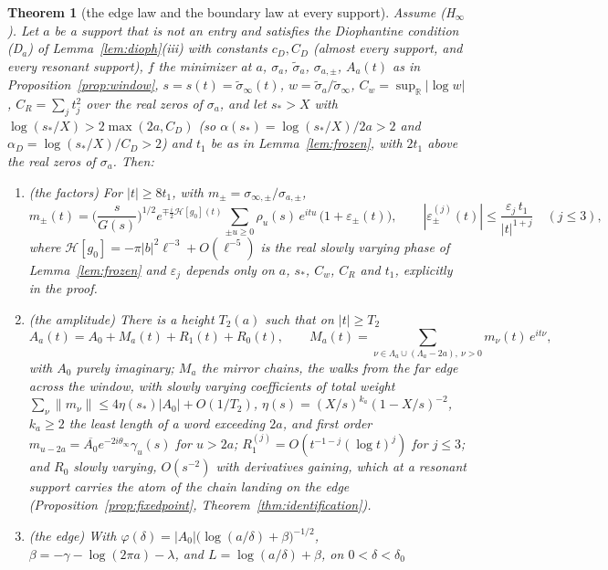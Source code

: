 \documentclass[11pt]{article}
\newtheorem{theorem}{Theorem}[section]
\theoremstyle{definition}
\theoremstyle{remark}
\newcommand{\R}{\mathbb{R}}
\begin{document}
\begin{theorem}[the edge law and the boundary law at every support]\label{thm:everysupport}
Assume (H$_\infty$). Let $a$ be a support that is not an entry and satisfies the Diophantine condition (D$_a$) of Lemma~\ref{lem:dioph}(iii) with constants $c_D,C_D$ (almost every support, and every resonant support), $f$ the minimizer at $a$, $\sigma_a$, $\tilde\sigma_a$, $\sigma_{a,\pm}$, $A_a(t)$ as in Proposition~\ref{prop:window}, $s=s(t)=\tilde\sigma_\infty(t)$, $w=\tilde\sigma_a/\tilde\sigma_\infty$, $C_w=\sup_\R|\log w|$, $C_R=\sum_jt_j^2$ over the real zeros of $\sigma_a$, and let $s_*>X$ with $\log(s_*/X)>2\max(2a,C_D)$ (so $\alpha(s_*)=\log(s_*/X)/2a>2$ and $\alpha_D=\log(s_*/X)/C_D>2$) and $t_1$ be as in Lemma~\ref{lem:frozen}, with $2t_1$ above the real zeros of $\sigma_a$. Then:
\begin{enumerate}
\item[(i)] (\emph{the factors}) For $|t|\ge8t_1$, with $m_\pm=\sigma_{\infty,\pm}/\sigma_{a,\pm}$,
\begin{equation}\label{eq:mline}
m_\pm(t)=\Big(\frac s{G(s)}\Big)^{1/2}e^{\mp\frac i2\mathcal H[g_0](t)}\sum_{\pm u\ge0}\rho_u(s)\,e^{itu}\,\big(1+\varepsilon_\pm(t)\big),\qquad|\varepsilon_\pm^{(j)}(t)|\le\frac{\varepsilon_j\,t_1}{|t|^{1+j}}\quad(j\le3),
\end{equation}
where $\mathcal H[g_0]=-\pi|b|^2\ell^{-3}+O(\ell^{-5})$ is the real slowly varying phase of Lemma~\ref{lem:frozen} and $\varepsilon_j$ depends only on $a$, $s_*$, $C_w$, $C_R$ and $t_1$, explicitly in the proof.
\item[(ii)] (\emph{the amplitude}) There is a height $T_2(a)$ such that on $|t|\ge T_2$
\[
A_a(t)=A_0+M_a(t)+R_1(t)+R_0(t),\qquad M_a(t)=\sum_{\nu\in\Lambda_a\cup(\Lambda_a-2a),\ \nu>0}m_\nu(t)\,e^{it\nu},
\]
with $A_0$ purely imaginary; $M_a$ the \emph{mirror chains}, the walks from the far edge across the window, with slowly varying coefficients of total weight $\sum_\nu\|m_\nu\|\le4\eta(s_*)|A_0|+O(1/T_2)$, $\eta(s)=(X/s)^{k_a}(1-X/s)^{-2}$, $k_a\ge2$ the least length of a word exceeding $2a$, and first order $m_{u-2a}=\overline{A_0}e^{-2i\theta_\infty}\gamma_u(s)$ for $u>2a$; $R_1^{(j)}=O(t^{-1-j}(\log t)^j)$ for $j\le3$; and $R_0$ slowly varying, $O(s^{-2})$ with derivatives gaining, which at a resonant support carries the atom of the chain landing on the edge (Proposition~\ref{prop:fixedpoint}, Theorem~\ref{thm:identification}).
\item[(iii)] (\emph{the edge}) With $\varphi(\delta)=|A_0|\big(\log(a/\delta)+\beta\big)^{-1/2}$, $\beta=-\gamma-\log(2\pi a)-\lambda$, and $L=\log(a/\delta)+\beta$, on $0<\delta<\delta_0$

\end{enumerate}
\end{theorem}
\end{document}

